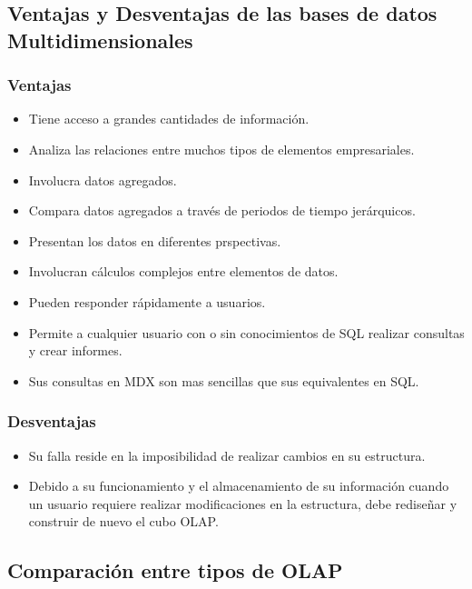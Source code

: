 \documentclass[DIV=calc, paper=a4, fontsize=11pt, twocolumn]{scrartcl}	 %
\begin{document}

\subsection*{Ventajas y Desventajas de las bases de datos Multidimensionales}
\subsubsection*{Ventajas}
\begin{itemize}
\item Tiene acceso a grandes cantidades de informaci\'{o}n.
\item Analiza las relaciones entre muchos tipos de elementos empresariales.
\item Involucra datos agregados.
\item Compara datos agregados a trav\'{e}s de periodos de tiempo jer\'{a}rquicos.
\item Presentan los datos en diferentes prspectivas.
\item Involucran c\'{a}lculos complejos entre elementos de datos.
\item Pueden responder r\'{a}pidamente a usuarios.
\item Permite a cualquier usuario con o sin conocimientos de SQL realizar consultas y crear informes.
\item Sus consultas en MDX son mas sencillas que sus equivalentes en SQL.
\end{itemize}
\subsubsection*{Desventajas}
\begin{itemize}
\item Su falla reside en la imposibilidad de realizar cambios en su estructura.
\item Debido a su funcionamiento y el almacenamiento de su informaci\'{o}n cuando un usuario requiere realizar modificaciones en la estructura, debe rediseñar y construir de nuevo el cubo OLAP.
\end{itemize}


\subsection*{Comparaci\'{o}n entre tipos de OLAP}
\end{document}
